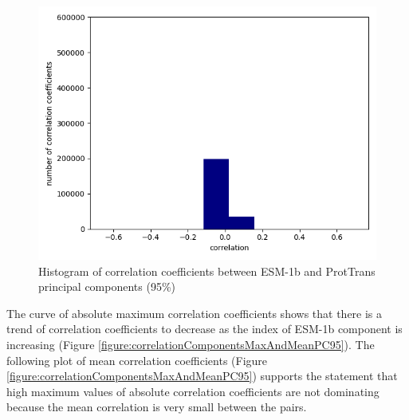 \documentclass[12pt]{article}
\begin{document}
	\begin{figure}[h!]
		\centering
		\includegraphics[scale=0.85]{validation_small_set_2_joined_PC_95_correlation_hist.png}

		\caption{Histogram of correlation coefficients between ESM-1b 
		and ProtTrans principal components (95\%)}
		\label{figure:correlationComponentsHistoPC95}
	\end{figure}

	\newpage

	The curve of absolute maximum correlation coefficients shows 
	that there is a trend of correlation coefficients to decrease 
	as the index of ESM-1b component is increasing 
	(Figure \ref{figure:correlationComponentsMaxAndMeanPC95}). The following 
	plot of mean correlation coefficients 
	(Figure \ref{figure:correlationComponentsMaxAndMeanPC95}) supports the 
	statement that high maximum values of absolute correlation 
	coefficients are not dominating 
	because the mean correlation is very small between the pairs.
\end{document}
